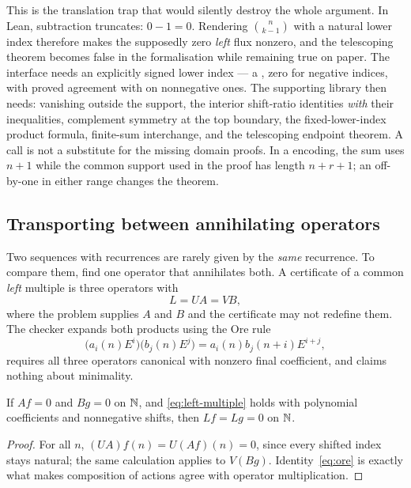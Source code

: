 \begin{remark}
This is the translation trap that would silently destroy the whole argument.
In Lean,  subtraction truncates: $0-1=0$. Rendering
$\binom{n}{k-1}$ with a natural lower index therefore makes the supposedly zero
\emph{left} flux nonzero, and the telescoping theorem becomes false in the
formalisation while remaining true on paper. The interface needs an explicitly
signed lower index --- a , zero for negative
indices, with proved agreement with  on nonnegative ones. The
supporting library then needs: vanishing outside the support, the interior
shift-ratio identities \emph{with} their inequalities, complement symmetry at
the top boundary, the fixed-lower-index product formula, finite-sum
interchange, and the telescoping endpoint theorem. A  call is
not a substitute for the missing domain proofs. In a 
encoding, the sum uses $n+1$ while the common support used in the proof has
length $n+r+1$; an off-by-one in either range changes the theorem.
\end{remark}

\subsection{Transporting between annihilating operators}
\label{sec:ore}

Two sequences with recurrences are rarely given by the \emph{same} recurrence.
To compare them, find one operator that annihilates both. A certificate of a
common \emph{left} multiple is three operators with
\begin{equation}\label{eq:left-multiple}
 L=UA=VB,
\end{equation}
where the problem supplies $A$ and $B$ and the certificate may not redefine
them. The checker expands both products using the Ore rule
\begin{equation}\label{eq:ore}
 \bigl(a_i(n)E^i\bigr)\bigl(b_j(n)E^j\bigr)=a_i(n)b_j(n+i)E^{i+j},
\end{equation}
requires all three operators canonical with nonzero final coefficient, and
claims nothing about minimality.

\begin{proposition}\label{prop:transport}
If $Af=0$ and $Bg=0$ on $\mathbb{N}$, and \eqref{eq:left-multiple} holds with polynomial
coefficients and nonnegative shifts, then $Lf=Lg=0$ on $\mathbb{N}$.
\end{proposition}
\begin{proof}
For all $n$, $(UA)f(n)=U(Af)(n)=0$, since every shifted index stays natural; the
same calculation applies to $V(Bg)$. Identity~\eqref{eq:ore} is exactly what
makes composition of actions agree with operator multiplication.
\end{proof}

